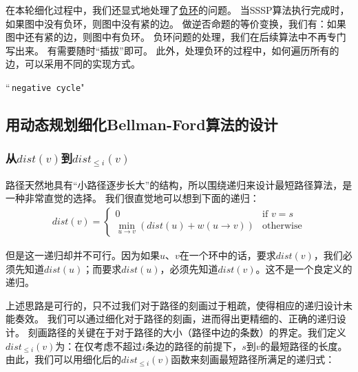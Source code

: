 在本轮细化过程中，我们还显式地处理了\ul{负环}的问题。
当SSSP算法执行完成时，如果图中没有负环，则图中没有紧的边。
做逆否命题的等价变换，我们有：如果图中还有紧的边，则图中有负环。
负环问题的处理，我们在后续算法中不再专门写出来。
有需要随时“插拔”即可。
此外，处理负环的过程中，如何遍历所有的边，可以采用不同的实现方式。

\begin{algorithm}[htbp]
    \caption{($s$)}
    \label{alg:bellman-ford-pre2}
    \begin{algorithmic}[1]
        \State {}
                    \State {}
                \EndIf
            \EndFor
        \EndFor
                \State \Return ``\,\texttt{negative cycle}"
            \EndIf
        \EndFor
    \end{algorithmic}
\end{algorithm}

\subsection{用动态规划细化Bellman-Ford算法的设计}

\subsubsection{从$dist(v)$到$dist_{\leq i}(v)$}

路径天然地具有“小路径逐步长大”的结构，所以围绕递归来设计最短路径算法，是一种非常直觉的选择。
我们很直觉地可以想到下面的递归：
\begin{align}
    dist(v) = \begin{cases}
        0 & \text{if } v=s \\
        \min\limits_{u\rightarrow v} (dist(u) + w(u\rightarrow v)) & \text{otherwise}
    \end{cases} 
\end{align}

\noindent 但是这一递归却并不可行。因为如果$u$、$v$在一个环中的话，要求$dist(v)$，我们必须先知道$dist(u)$；而要求$dist(u)$，必须先知道$dist(v)$。这不是一个良定义的递归。

上述思路是可行的，只不过我们对于路径的刻画过于粗疏，使得相应的递归设计未能奏效。
我们可以通过细化对于路径的刻画，进而得出更精细的、正确的递归设计。
刻画路径的关键在于对于路径的大小（路径中边的条数）的界定。我们定义$dist_{\leq i}(v)$为：在仅考虑不超过$i$条边的路径的前提下，$s$到$v$的最短路径的长度。由此，我们可以用细化后的$dist_{\leq i}(v)$函数来刻画最短路径所满足的递归式：

